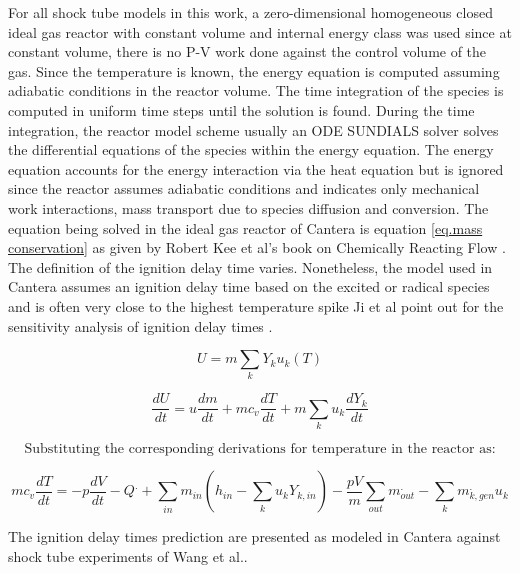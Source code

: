 For all shock tube models in this work, a zero-dimensional homogeneous closed ideal gas reactor with constant volume and internal energy class was used since at constant volume, there is no P-V work done against the control volume of the gas. Since the temperature is known, the energy equation is computed assuming adiabatic conditions in the reactor volume. The time integration of the species is computed in uniform time steps until the solution is found. During the time integration, the reactor model scheme usually an ODE SUNDIALS solver \cite{hindmarsh2005sundials} solves the differential equations of the species within the energy equation. The energy equation accounts for the energy interaction via the heat equation but is ignored since the reactor assumes adiabatic conditions and indicates only mechanical work interactions, mass transport due to species diffusion and conversion.  The equation being solved in the ideal gas reactor  of Cantera is equation \ref{eq.mass conservation} as given by Robert Kee et al's book on Chemically Reacting Flow \cite{Kee2003ChemicallyPractice}. The definition of the ignition delay time varies. Nonetheless, the model used in Cantera assumes an ignition delay time based on the excited  or  radical species and is often very close to the highest temperature spike Ji et al point out for the sensitivity analysis of ignition delay times \cite{Ji2019EvolutionAutoignition}. 

\begin{equation}
    U = m\sum_k{Y_k u_k(T)}
\end{equation}

\begin{equation}
    \frac{dU}{dt} = u\frac{dm}{dt}+mc_v\frac{dT}{dt}+m\sum_k{u_k \frac{dY_k}{dt}}
\end{equation}

\[\text{Substituting the corresponding derivations for temperature in the reactor as:} \]


\begin{equation}
    mc_v\frac{dT}{dt}=-p\frac{dV}{dt} - Q^. + \sum_{in}{m_{in}(h_{in}- \sum_k{u_k Y_{k, in}}) -\frac{pV}{m}\sum_{out}{m_{out}^.} - \sum_k{m_{k, gen}^. u_k}}
    \label{eq.mass conservation}
\end{equation}

The ignition delay times prediction are presented as modeled in Cantera against shock tube experiments of Wang et al.\cite{Wang2012}.

